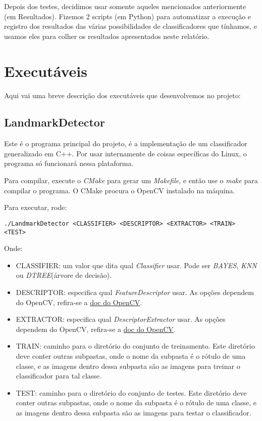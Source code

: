 Depois dos testes, decidimos usar somente aqueles mencionados anteriormente (em Resultados).
Fizemos 2 scripts (em Python) para automatizar a execução e registro dos resultados das várias 
possibilidades de classificadores que tínhamos, e usamos eles para colher os resultados apresentados
neste relatório.

\section{Executáveis}
Aqui vai uma breve descrição dos executáveis que desenvolvemos no projeto:

\subsection{LandmarkDetector}
Este é o programa principal do projeto, é a implementação de um classificador generalizado em C++.
Por usar internamente de coisas específicas do Linux, o programa só funcionará nessa plataforma.

Para compilar, execute o \textit{CMake} para gerar um \textit{Makefile}, e então use o \textit{make}
para compilar o programa. O CMake procura o OpenCV instalado na máquina.

Para executar, rode:
\begin{small}
\begin{verbatim}
./LandmarkDetector <CLASSIFIER> <DESCRIPTOR> <EXTRACTOR> <TRAIN> <TEST>
\end{verbatim}
\end{small}
Onde:
\begin{itemize}
  \item CLASSIFIER: um valor que dita qual \textit{Classifier} usar. Pode ser \textit{BAYES}, \textit{KNN}
        ou \textit{DTREE}(árvore de decisão).
  \item DESCRIPTOR: especifica qual \textit{FeatureDescriptor} usar. As opções dependem do OpenCV, refira-se
        a \hyperref{http://docs.opencv.org/modules/features2d/doc/common_interfaces_of_feature_detectors.html}{}{featuredetector-create}{doc do OpenCV}.
  \item EXTRACTOR: especifica qual \textit{DescriptorExtractor} usar. As opções dependem do OpenCV, refira-se
        a \hyperref{http://docs.opencv.org/modules/features2d/doc/common_interfaces_of_descriptor_extractors.html}{}{descriptorextractor-create}{doc do OpenCV}.
  \item TRAIN: caminho para o diretório do conjunto de treinamento. Este diretório deve conter outras subpastas, 
        onde o nome da subpasta é o rótulo de uma classe, e as imagens dentro dessa subpasta são as imagens para
        treinar o classificador para tal classe.
  \item TEST: caminho para o diretório do conjunto de testes. Este diretório deve conter outras subpastas, 
        onde o nome da subpasta é o rótulo de uma classe, e as imagens dentro dessa subpasta são as imagens para
        testar o classificador.
\end{itemize}

